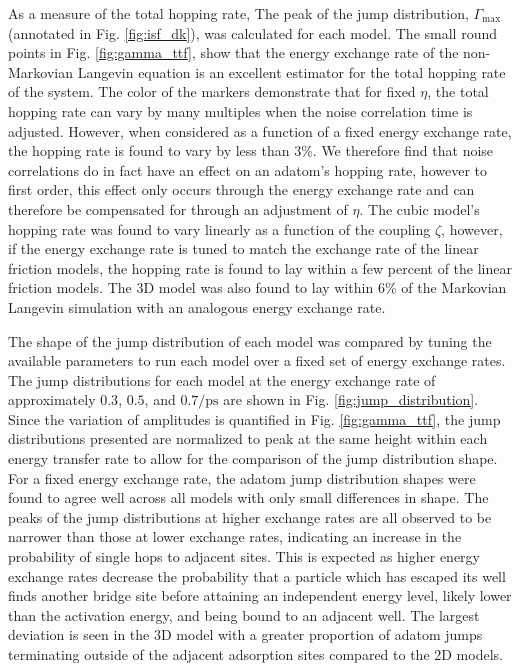 \documentclass[7pt]{article}
\newcommand{\ips}{\si{\per\pico\second}}
\begin{document}
As a measure of the total hopping rate, The peak of the jump distribution, $\Gamma_{\text{max}}$ (annotated in Fig. \ref{fig:isf_dk}), was calculated for each model. The small round points in Fig. \ref{fig:gamma_ttf}, show that the energy exchange rate of the non-Markovian Langevin equation is an excellent estimator for the total hopping rate of the system. The color of the markers demonstrate that for fixed $\eta$, the total hopping rate can vary by many multiples when the noise correlation time is adjusted. However, when considered as a function of a fixed energy exchange rate, the hopping rate is found to vary by less than $3$\%. We therefore find that noise correlations do in fact have an effect on an adatom's hopping rate, however to first order, this effect only occurs through the energy exchange rate and can therefore be compensated for through an adjustment of $\eta$. The cubic model's hopping rate was found to vary linearly as a function of the coupling $\zeta$, however, if the energy exchange rate is tuned to match the exchange rate of the linear friction models, the hopping rate is found to lay within a few percent of the linear friction models. The 3D model was also found to lay within $6$\% of the Markovian Langevin simulation with an analogous energy exchange rate. 

The shape of the jump distribution of each model was compared by tuning the available parameters to run each model over a fixed set of energy exchange rates. The jump distributions for each model at the energy exchange rate of approximately $0.3$, $0.5$, and $0.7\ips$ are shown in Fig. \ref{fig:jump_distribution}. Since the variation of amplitudes is quantified in Fig. \ref{fig:gamma_ttf}, the jump distributions presented are normalized to peak at the same height within each energy transfer rate to allow for the comparison of the jump distribution shape. For a fixed energy exchange rate, the adatom jump distribution shapes were found to agree well across all models with only small differences in shape. The peaks of the jump distributions at higher exchange rates are all observed to be narrower than those at lower exchange rates, indicating an increase in the probability of single hops to adjacent sites\cite{Diamant}. This is expected as higher energy exchange rates decrease the probability that a particle which has escaped its well finds another bridge site before attaining an independent energy level, likely lower than the activation energy, and being bound to an adjacent well. The largest deviation is seen in the 3D model with a greater proportion of adatom jumps terminating outside of the adjacent adsorption sites compared to the 2D models.  
\end{document}
